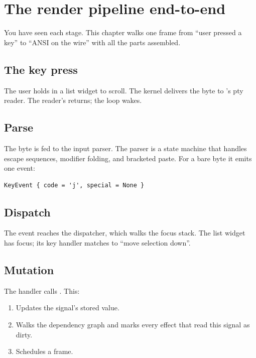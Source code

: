 \chapter{The render pipeline end-to-end}
\label{ch:pipeline2}

\begin{aside}
You have seen each stage. This chapter walks one frame from
``user pressed a key'' to ``ANSI on the wire'' with all the
parts assembled.
\end{aside}

\section{The key press}

The user holds  in a list widget to scroll. The kernel
delivers the byte to \maya{}'s pty reader. The reader's
 returns; the loop wakes.

\section{Parse}

The byte is fed to the input parser. The parser is a state
machine that handles escape sequences, modifier folding, and
bracketed paste. For a bare  byte it emits one event:

\begin{lstlisting}
KeyEvent { code = 'j', special = None }
\end{lstlisting}

\section{Dispatch}

The event reaches the dispatcher, which walks the focus stack.
The list widget has focus; its key handler matches 
to ``move selection down''.

\section{Mutation}

The handler calls . This:

\begin{enumerate}[leftmargin=*]
  \item Updates the signal's stored value.
  \item Walks the dependency graph and marks every effect
    that read this signal as dirty.
  \item Schedules a frame.
\end{enumerate}

